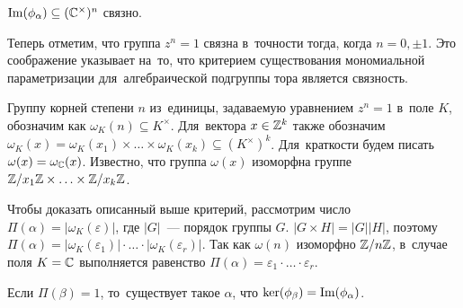 \documentclass[a4paper,oneside]{article}
\begin{document}
\begin{statement*}
  $\mathrm{Im}(\phi_\alpha) \subseteq (\mathbb{C}^\times)^n$ связно.
\end{statement*}

Теперь отметим, что группа $z^n = 1$ связна в~точности тогда, когда $n = 0, \pm 1$.
Это соображение указывает на~то, что критерием существования мономиальной параметризации
для~алгебраической подгруппы тора является связность.

Группу корней степени $n$ из~единицы, задаваемую уравнением $z^n = 1$ в~поле $K$, обозначим как $\omega_K(n) \subseteq K^\times$.
Для~вектора $x \in \mathbb{Z}^k$ также обозначим $\omega_K(x) = \omega_K(x_1) \times \ldots \times \omega_K(x_k) \subseteq (K^\times)^k$.
Для~краткости будем писать $\omega(x) = \omega_{\mathbb{C}}(x)$. Известно, что группа $\omega(x)$ изоморфна
группе $\mathbb{Z} / x_1 \mathbb{Z} \times \ldots \times \mathbb{Z} / x_k \mathbb{Z}$.

Чтобы доказать описанный выше критерий, рассмотрим число $\Pi(\alpha) = |\omega_K(\varepsilon)|$, где $|G|$~— порядок группы $G$.
$|G \times H| = |G| |H|$, поэтому $\Pi(\alpha) = |\omega_K(\varepsilon_1)| \cdot \ldots \cdot |\omega_K(\varepsilon_r)|$.
Так как $\omega(n)$ изоморфно $\mathbb{Z} / n \mathbb{Z}$, в~случае поля $K = \mathbb{C}$ выполняется
равенство $\Pi(\alpha) = \varepsilon_1 \cdot \ldots \cdot \varepsilon_r$.

\begin{lemma}
\label{lemma:exactOutOfPi}
  Если $\Pi(\beta) = 1$, то~существует такое $\alpha$, что $\ker(\phi_\beta) = \mathrm{Im}(\phi_\alpha)$.
\end{lemma}
\end{document}
